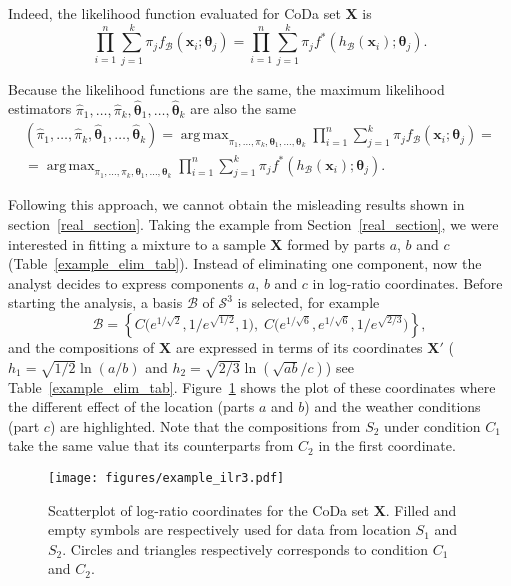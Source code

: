 \documentclass[12pt, a4paper]{article}
\newcommand{\m}[1]{\boldsymbol{#1}}
\DeclareMathOperator*{\argmax}{arg\,max}
\begin{document}
Indeed, the likelihood function evaluated for CoDa set $\mathbf{X}$ is
\begin{equation}\label{likeli1}
\prod_{i=1}^n \sum_{j=1}^k \pi_j f_\mathcal{B}(\textbf{x}_i; \m\theta_j)=\prod_{i=1}^n \sum_{j=1}^k \pi_j f^*(h_\mathcal{B}(\textbf{x}_i); \m\theta_j).
\end{equation}

Because the likelihood functions are the same,  the maximum likelihood estimators $\hat{\pi}_1, \dots, \hat{\pi}_k, \hat{\m\theta}_1, \dots, \hat{\m\theta}_k$ are also the same
\begin{eqnarray}\label{likeli2}
\left( \hat{\pi}_1, \dots, \hat{\pi}_k, \hat{\m\theta}_1, \dots, \hat{\m\theta}_k\right) = \argmax_{\pi_1, \dots, \pi_k, \m\theta_1, \dots, \m\theta_k} \prod_{i=1}^n \sum_{j=1}^k \pi_j f_\mathcal{B}(\textbf{x}_i; \m\theta_j) = \\ 
= \argmax_{\pi_1, \dots, \pi_k, \m\theta_1, \dots, \m\theta_k} \prod_{i=1}^n \sum_{j=1}^k \pi_j f^*(h_\mathcal{B}(\textbf{x}_i); \m\theta_j).
\end{eqnarray}


Following this approach, we cannot obtain the misleading results shown in section~\ref{real_section}. Taking the example from Section~\ref{real_section}, we were interested in fitting a mixture to a sample $\mathbf{X}$ formed by parts $a$, $b$ and $c$ (Table~\ref{example_elim_tab}). Instead of eliminating one component, now the analyst decides to express components $a$, $b$ and $c$ in log-ratio coordinates. Before starting the analysis, a basis $\mathcal{B}$ of $\mathcal{S}^3$ is selected, for example
\begin{equation}
\mathcal{B} = \left\{ C\Big( e^{1/\sqrt{2}}, 1/e^{\sqrt{1/2}}, 1 \Big), \; C\Big( e^{1/\sqrt{6}}, e^{1/\sqrt{6}}, 1/e^{\sqrt{2/3}} \Big) \right\},
\end{equation}
and the compositions of $\mathbf{X}$ are expressed in terms of its coordinates 
$\mathbf{X}'$ ($h_1 = \sqrt{1/2} \ln(a/b)$ and $h_2 = \sqrt{2/3} \ln(\sqrt{ab} / c)$) see Table~\ref{example_elim_tab}. Figure~\ref{example_ilr3} shows the plot of these coordinates where the different effect of the location (parts $a$ and $b$) and the weather conditions (part $c$) are highlighted. Note that the compositions from $S_2$ under condition $C_1$ take the same value that its counterparts from $C_2$ in the first coordinate. 



\begin{figure}[thbp]
\centering
\texttt{[image: figures/example\_ilr3.pdf]}
\caption{Scatterplot of log-ratio coordinates for the CoDa set $\mathbf{X}$. Filled and empty symbols are respectively used for data from location $S_1$ and $S_2$. Circles and triangles respectively corresponds to condition $C_1$ and $C_2$.}\label{example_ilr3}
\end{figure}
\end{document}
